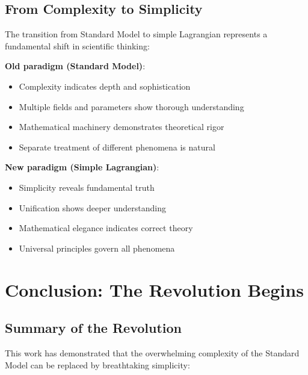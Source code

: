 \documentclass[12pt,a4paper]{article}
\theoremstyle{definition}
\theoremstyle{remark}
\begin{document}
	\subsection{From Complexity to Simplicity}
	
	The transition from Standard Model to simple Lagrangian represents a fundamental shift in scientific thinking:
	
	\textbf{Old paradigm (Standard Model)}:
	\begin{itemize}
		\item Complexity indicates depth and sophistication
		\item Multiple fields and parameters show thorough understanding
		\item Mathematical machinery demonstrates theoretical rigor
		\item Separate treatment of different phenomena is natural
	\end{itemize}
	
	\textbf{New paradigm (Simple Lagrangian)}:
	\begin{itemize}
		\item Simplicity reveals fundamental truth
		\item Unification shows deeper understanding
		\item Mathematical elegance indicates correct theory
		\item Universal principles govern all phenomena
	\end{itemize}
	
	\section{Conclusion: The Revolution Begins}
	
	\subsection{Summary of the Revolution}
	
	This work has demonstrated that the overwhelming complexity of the Standard Model can be replaced by breathtaking simplicity:
	
\end{document}
